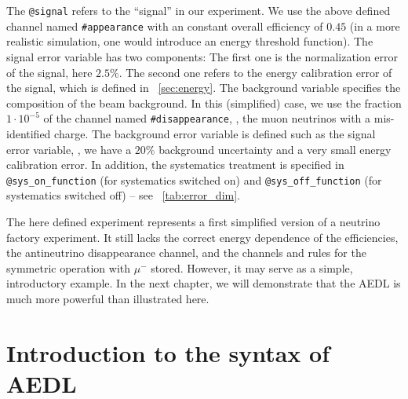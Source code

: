The {\tt @signal} refers to the ``signal'' in our experiment. We use the
above defined channel named {\tt \#appearance} with an constant overall
efficiency of $0.45$ (in a more realistic simulation, one would introduce an
energy threshold function). The signal error variable has two components: 
The first one is the normalization error of the signal, here $2.5\%$. The second 
one refers to the energy calibration error of the signal, which is defined 
in \Sec~\ref{sec:energy}. The background variable
specifies the composition of the beam background. In this (simplified) case, we
use the fraction $1\cdot 10^{-5}$ of the channel named {\tt \#disappearance}, \ie , the muon neutrinos with a mis-identified charge. 
The background error variable is defined such as the signal error variable, \ie , we have a $20\%$ background uncertainty and a very small energy calibration error. In addition, the systematics treatment is specified
in {\tt @sys\_on\_function} (for systematics switched on) and {\tt @sys\_off\_function} (for systematics switched off) -- see \Tab~\ref{tab:error_dim}. 

The here defined experiment represents a first simplified version of a neutrino factory experiment. It still lacks the correct energy dependence of the efficiencies, the antineutrino disappearance channel, and the channels and rules for the symmetric operation with $\mu^-$ stored. However, it may serve as a simple, introductory example. In the next chapter, we will demonstrate that the AEDL is much more powerful than illustrated here.


\section{Introduction to the syntax of AEDL}
\label{sec:syntax}

